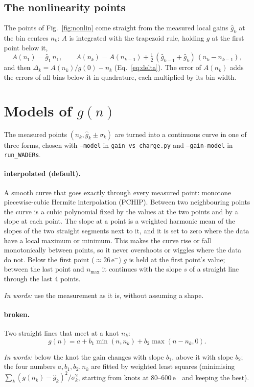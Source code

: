 \documentclass[11pt,a4paper]{article}
\newcommand{\code}[1]{\texttt{#1}}
\newcommand{\eminus}{e$^-$}
\newcommand{\nmax}{n_{\mathrm{max}}}
\newcommand{\inwords}[1]{\par\noindent\textit{In words:} #1\par}
\begin{document}
\subsection{The nonlinearity points}
\label{sec:deltapts}
The points of Fig.~\ref{fig:nonlin} come straight from the measured local gains $\hat g_k$ at the bin
centres $n_k$: $A$ is integrated with the trapezoid rule, holding $g$ at the first point below it,
\begin{equation}
A(n_1) = \hat g_1\,n_1, \qquad
A(n_k) = A(n_{k-1}) + \tfrac12\,(\hat g_{k-1} + \hat g_k)\,(n_k - n_{k-1}),
\end{equation}
and then $\Delta_k = A(n_k)/g(0) - n_k$ (Eq.~\ref{eq:delta}). The error of $A(n_k)$ adds the errors of
all bins below it in quadrature, each multiplied by its bin width.

\section{Models of $g(n)$}
\label{sec:forms}
The measured points $(n_k, \hat g_k \pm \sigma_k)$ are turned into a continuous curve in one of three
forms, chosen with \code{--model} in \code{gain\_vs\_charge.py} and \code{--gain-model} in
\code{run\_WADERs}.

\paragraph{interpolated (default).} A smooth curve that goes exactly through every measured point:
monotone piecewise-cubic Hermite interpolation (PCHIP). Between two neighbouring points the curve is a
cubic polynomial fixed by the values at the two points and by a slope at each point. The slope at a
point is a weighted harmonic mean of the slopes of the two straight segments next to it, and it is set
to zero where the data have a local maximum or minimum. This makes the curve rise or fall
monotonically between points, so it never overshoots or wiggles where the data do not. Below the first
point ($\approx 26$\,\eminus) $g$ is held at the first point's value; between the last point and $\nmax$
it continues with the slope $s$ of a straight line through the last 4 points.
\inwords{use the measurement as it is, without assuming a shape.}

\paragraph{broken.} Two straight lines that meet at a knot $n_k$:
\begin{equation}
g(n) = a + b_1 \min(n, n_k) + b_2 \max(n - n_k, 0) .
\end{equation}
\inwords{below the knot the gain changes with slope $b_1$, above it with slope $b_2$; the four numbers
$a, b_1, b_2, n_k$ are fitted by weighted least squares (minimising $\sum_k (g(n_k) - \hat g_k)^2/
\sigma_k^2$, starting from knots at 80--600\,\eminus{} and keeping the best).}
\end{document}
